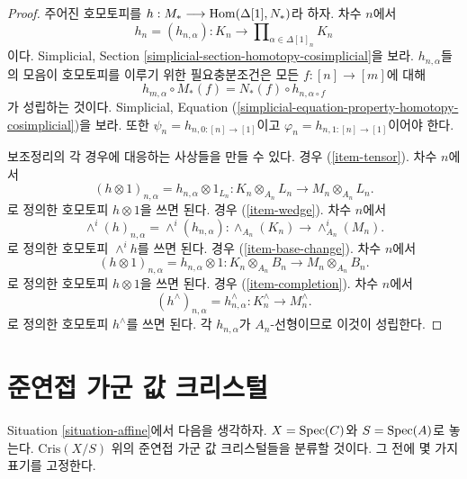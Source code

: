 \begin{proof}
주어진 호모토피를
$h : M_* \longrightarrow \mathop{\mathrm{Hom}}\nolimits(\Delta[1], N_*)$라 하자.
차수 $n$에서
$$
h_n = (h_{n, \alpha}) :
K_n \longrightarrow
\prod\nolimits_{\alpha \in \Delta[1]_n} K_n
$$
이다. Simplicial, Section
\ref{simplicial-section-homotopy-cosimplicial}을 보라.
$h_{n, \alpha}$들의 모음이 호모토피를 이루기 위한 필요충분조건은
모든 $f : [n] \to [m]$에 대해
$$
h_{m, \alpha} \circ M_*(f) = N_*(f) \circ h_{n, \alpha \circ f}
$$
가 성립하는 것이다. Simplicial, Equation
(\ref{simplicial-equation-property-homotopy-cosimplicial})을 보라.
또한 $\psi_n = h_{n, 0 : [n] \to [1]}$이고
$\varphi_n = h_{n, 1 : [n] \to [1]}$이어야 한다.

\medskip\noindent
보조정리의 각 경우에 대응하는 사상들을 만들 수 있다.
경우 (\ref{item-tensor}). 차수 $n$에서
$$
(h \otimes 1)_{n, \alpha} = h_{n, \alpha} \otimes 1_{L_n} :
K_n \otimes_{A_n} L_n
\longrightarrow
M_n \otimes_{A_n} L_n.
$$
로 정의한 호모토피 $h \otimes 1$을 쓰면 된다.
경우 (\ref{item-wedge}). 차수 $n$에서
$$
\wedge^i(h)_{n, \alpha} = \wedge^i(h_{n, \alpha}) :
\wedge_{A_n}(K_n)
\longrightarrow
\wedge^i_{A_n}(M_n).
$$
로 정의한 호모토피 $\wedge^ih$를 쓰면 된다.
경우 (\ref{item-base-change}). 차수 $n$에서
$$
(h \otimes 1)_{n, \alpha} = h_{n, \alpha} \otimes 1 :
K_n \otimes_{A_n} B_n
\longrightarrow
M_n \otimes_{A_n} B_n.
$$
로 정의한 호모토피 $h \otimes 1$을 쓰면 된다.
경우 (\ref{item-completion}). 차수 $n$에서
$$
(h^\wedge)_{n, \alpha} = h_{n, \alpha}^\wedge :
K_n^\wedge
\longrightarrow
M_n^\wedge.
$$
로 정의한 호모토피 $h^\wedge$를 쓰면 된다. 각
$h_{n, \alpha}$가 $A_n$-선형이므로 이것이 성립한다.
\end{proof}






\section{준연접 가군 값 크리스털}
\label{section-quasi-coherent-crystals}

\noindent
Situation \ref{situation-affine}에서 다음을 생각하자.
$X = \mathop{\mathrm{Spec}}(C)$와 $S = \mathop{\mathrm{Spec}}(A)$로 놓는다.
$\text{Cris}(X/S)$ 위의 준연접 가군 값 크리스털들을 분류할 것이다.
그 전에 몇 가지 표기를 고정한다.

